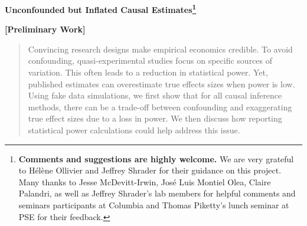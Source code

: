 \documentclass[12pt]{article}
\renewcommand{\thefootnote}{\fnsymbol{footnote}}
\begin{document}



\begin{titlepage}
\vspace*{-2cm}
\begin{flushleft}
\Huge{}\selectfont\textbf{Unconfounded but Inflated Causal Estimates\footnote[2]{\textbf{Comments and suggestions are highly welcome.} We are very grateful to Hélène Ollivier and Jeffrey Shrader for their guidance on this project. Many thanks to Jesse McDevitt-Irwin, José Luis Montiel Olea, Claire Palandri, as well as Jeffrey Shrader's lab members for helpful comments and seminars participants at Columbia and Thomas Piketty's lunch seminar at PSE for their feedback.}}
\end{flushleft}
\renewcommand{\thefootnote}{\arabic{footnote}}
\begin{flushleft}
{\large
Vincent Bagilet\footnote{Columbia University, New York, USA. Email: \url{vincent.bagilet@columbia.edu}}\\[3pt] 
}
\\ [0.3cm] 
\normalsize{March 1st, 2022} \\
}

\end{flushleft}
\begin{center}
{\bfseries\LARGE  \color{cerulean}[Preliminary Work]}
\end{center}
\begin{abstract}
\noindent Convincing research designs make empirical economics credible. To avoid confounding, quasi-experimental studies focus on specific sources of variation. This often leads to a reduction in statistical power. Yet, published estimates can overestimate true effects sizes when power is low. Using fake data simulations, we first show that for all causal inference methods, there can be a trade-off between confounding and exaggerating true effect sizes due to a loss in power. We then discuss how reporting statistical power calculations could help address this issue.

\bigskip
\end{abstract}
\setcounter{page}{0}
\thispagestyle{empty}
\end{titlepage}

\renewcommand{\thefootnote}{\arabic{footnote}}
\end{document}
